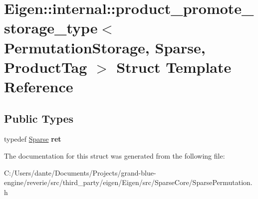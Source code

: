 \hypertarget{struct_eigen_1_1internal_1_1product__promote__storage__type_3_01_permutation_storage_00_01_sparse_00_01_product_tag_01_4}{}\section{Eigen\+::internal\+::product\+\_\+promote\+\_\+storage\+\_\+type$<$ Permutation\+Storage, Sparse, Product\+Tag $>$ Struct Template Reference}
\label{struct_eigen_1_1internal_1_1product__promote__storage__type_3_01_permutation_storage_00_01_sparse_00_01_product_tag_01_4}
\subsection*{Public Types}
\begin{DoxyCompactItemize}
\item 
\mbox{\label{struct_eigen_1_1internal_1_1product__promote__storage__type_3_01_permutation_storage_00_01_sparse_00_01_product_tag_01_4_affeea42c7eafb00d21e67bc7c26a2014}} 
typedef \mbox{\hyperlink{struct_eigen_1_1_sparse}{Sparse}} {\bfseries ret}
\end{DoxyCompactItemize}


The documentation for this struct was generated from the following file\+:\begin{DoxyCompactItemize}
\item 
C\+:/\+Users/dante/\+Documents/\+Projects/grand-\/blue-\/engine/reverie/src/third\+\_\+party/eigen/\+Eigen/src/\+Sparse\+Core/Sparse\+Permutation.\+h\end{DoxyCompactItemize}
